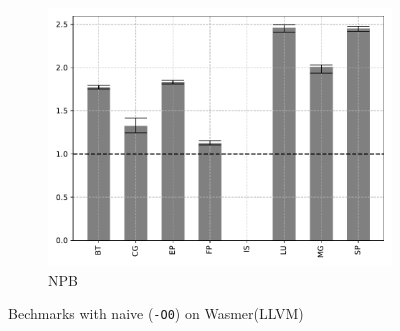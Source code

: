 \begin{figure}
\begin{subfigure}[t]{.45\textwidth}
        \includegraphics[width=\textwidth]
        {Images/6.1.RQ1/npb-wasmer-llvm-naive.pdf}
        \caption{NPB}
    \end{subfigure}
    \caption{Bechmarks with naive (\texttt{-O0}) on Wasmer(LLVM)}
\end{figure}

